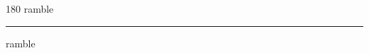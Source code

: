 
\begin{frame}
\begin{center}
\begin{turn}{180}
{\fontsize{2.5cm}{1em}\selectfont ramble}
\end{turn}
\vspace{1em}\par  
\hrule
\vspace{1em}\par  
{\fontsize{2.5cm}{1em}\selectfont ramble}
\end{center}
\end{frame}
